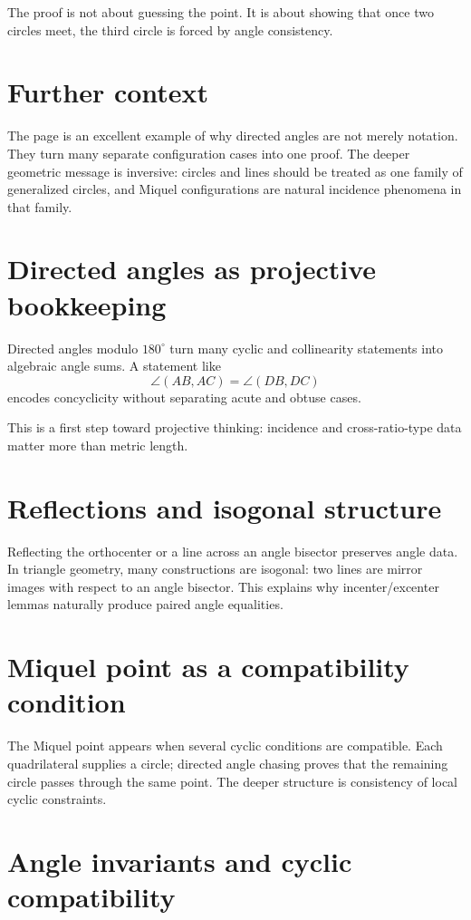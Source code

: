The proof is not about guessing the point.  It is about showing that once two circles meet, the third circle is forced by angle consistency.

\section{Further context}

The page is an excellent example of why directed angles are not merely notation.  They turn many separate configuration cases into one proof.  The deeper geometric message is inversive: circles and lines should be treated as one family of generalized circles, and Miquel configurations are natural incidence phenomena in that family.

\section{Directed angles as projective bookkeeping}

Directed angles modulo \(180^\circ\) turn many cyclic and collinearity statements into algebraic angle sums.  A statement like
\[
  \angle(AB,AC)=\angle(DB,DC)
\]
encodes concyclicity without separating acute and obtuse cases.

This is a first step toward projective thinking: incidence and cross-ratio-type data matter more than metric length.

\section{Reflections and isogonal structure}

Reflecting the orthocenter or a line across an angle bisector preserves angle data.  In triangle geometry, many constructions are isogonal: two lines are mirror images with respect to an angle bisector.  This explains why incenter/excenter lemmas naturally produce paired angle equalities.

\section{Miquel point as a compatibility condition}

The Miquel point appears when several cyclic conditions are compatible.  Each quadrilateral supplies a circle; directed angle chasing proves that the remaining circle passes through the same point.  The deeper structure is consistency of local cyclic constraints.

\section{Angle invariants and cyclic compatibility}

